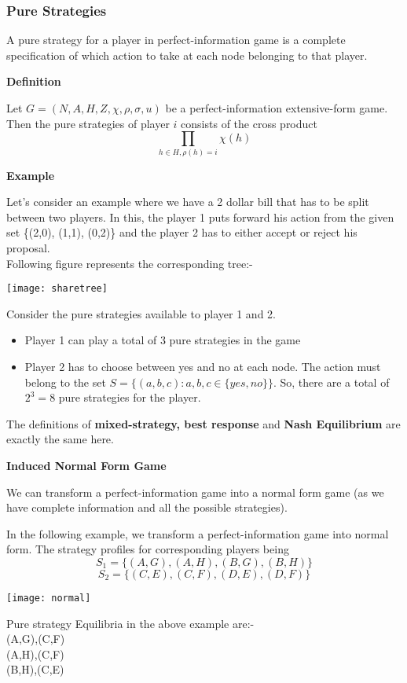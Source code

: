 \subsubsection{Pure Strategies}
A pure strategy for a player in perfect-information game is a complete specification of which action to take at each node belonging to that player. 
\begin{flushleft}
\textbf{Definition}
\end{flushleft}
Let $G = (N, A, H, Z, \chi, \rho, \sigma, u)$ be a perfect-information extensive-form game. Then the pure strategies of player $i$ consists of the cross product $$\prod_{h\in H, \rho(h)=i} \chi(h)$$
\begin{flushleft}
\textbf{Example}
\end{flushleft}
Let's consider an example where we have a 2 dollar bill that has to be split between two players. In this, the player 1 puts forward his action from the given set \{(2,0), (1,1), (0,2)\} and the player 2 has to either accept or reject his proposal.\\
Following figure represents the corresponding tree:-
\begin{center}
\texttt{[image: sharetree]}
\end{center}
Consider the pure strategies available to player 1 and 2.
\begin{itemize}
\item Player 1 can play a total of 3 pure strategies in the game
\item Player 2 has to choose between yes and no at each node. The action must belong to the set $S= \{ (a,b,c): a,b,c \in \{yes, no\}\} $. So, there are a total of $2^3 = 8$ pure strategies for the player.
\end{itemize}

The definitions of \textbf{mixed-strategy, best response} and \textbf{Nash Equilibrium} are exactly the same here.
\begin{flushleft}
\textbf{Induced Normal Form Game}
\end{flushleft}
We can transform a perfect-information game into a normal form game (as we have complete information and all the possible strategies).

In the following example, we transform a perfect-information game into normal form. The strategy profiles for corresponding players being $$S_1 =\{(A,G), (A,H), (B,G), (B,H)\} $$ $$S_2=\{ (C,E), (C,F), (D,E), (D,F)\}$$
\begin{center}
\texttt{[image: normal]}
\end{center}
Pure strategy Equilibria in the above example are:-\\
(A,G),(C,F)\\
(A,H),(C,F)\\
(B,H),(C,E)\\

